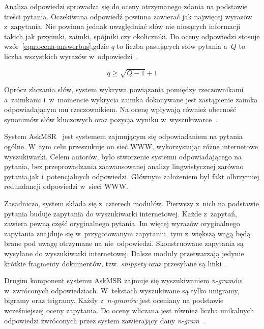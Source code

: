 Analiza odpowiedzi sprowadza się do oceny otrzymanego zdania na podstawie treści pytania. Oczekiwana odpowiedź powinna zawierać jak najwięcej wyrazów z~zapytania. Nie powinna jednak uwzględniać słów nie niosących informacji takich jak przyimki, zaimki, spójniki czy okoliczniki. Do oceny odpowiedzi stosuje wzór~\ref{eqn:ocena-answerbus},gdzie $q$ to liczba pasujących słów pytania a~$Q$ to liczba wszystkich wyrazów w~odpowiedzi~\cite{zheng2002answerbus}.

\begin{equation}
\label{eqn:ocena-answerbus}
q \geq  \sqrt{Q - 1}  + 1
\end{equation}

Oprócz zliczania słów, system wykrywa powiązania pomiędzy rzeczownikami a~zaimkami i~w~momencie wykrycia zaimka dokonywane jest zastąpienie zaimka odpowiadającym mu rzeczownikiem. Na ocenę wpływają również obecność synonimów słów kluczowych oraz pozycja wyniku w~wyszukiwarce~\cite{zheng2002answerbus}.

\label{askmr}
System AskMSR~\cite{brill2002analysis} jest systemem zajmującym się odpowiadaniem na pytania ogólne. W~tym celu przeszukuje on sieć WWW, wykorzystując różne internetowe wyszukiwarki. Celem autorów, było stworzenie systemu odpowiadającego na pytania, bez przeprowadzania zaawansowanej analizy lingwistycznej zarówno pytania,jak i~potencjalnych odpowiedzi. Głównym założeniem był fakt olbrzymiej redundancji odpowiedzi w~sieci WWW.

Zasadniczo, system składa się z~czterech modułów. Pierwszy z~nich na podstawie pytania buduje zapytania do wyszukiwarki internetowej. Każde z~zapytań, zawiera pewną część oryginalnego pytania. Im więcej wyrazów oryginalnego zapytania znajduje się w~przygotowanym zapytaniu, tym z~większą wagą będą brane pod uwagę otrzymane na nie odpowiedzi. Skonstruowane zapytania są wysyłane do wyszukiwarki internetowej. Dalsze moduły przetwarzają jedynie krótkie fragmenty dokumentów, tzw. \emph{snippety} oraz przesyłane są linki~\cite{brill2002analysis}.

Drugim komponent systemu AskMSR zajmuje się wyszukiwaniem \emph{n-gramów} w~zwróconych odpowiedziach. W~tekstach wyszukiwane są tylko unigramy, bigramy oraz trigramy. Każdy z~\emph{n-gramów} jest oceniany na podstawie wcześniejszej oceny zapytania. Do oceny wliczana jest również liczba unikalnych odpowiedzi zwróconych przez system zawierający dany \emph{n-gram}~\cite{brill2002analysis}.

